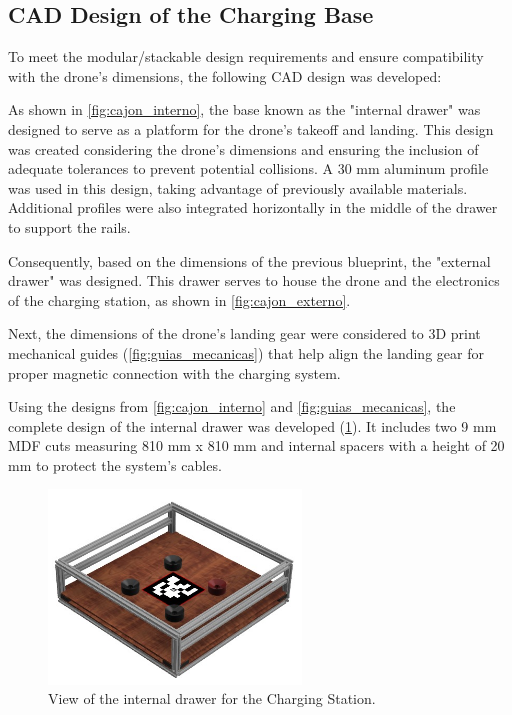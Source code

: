 \subsection{CAD Design of the Charging Base}

To meet the modular/stackable design requirements and ensure compatibility with the drone's dimensions, the following CAD design was developed:

As shown in \ref{fig:cajon_interno}, the base known as the "internal drawer" was designed to serve as a platform for the drone's takeoff and landing. This design was created considering the drone's dimensions and ensuring the inclusion of adequate tolerances to prevent potential collisions. A 30 mm aluminum profile was used in this design, taking advantage of previously available materials. Additional profiles were also integrated horizontally in the middle of the drawer to support the rails.
        
        
Consequently, based on the dimensions of the previous blueprint, the "external drawer" was designed. This drawer serves to house the drone and the electronics of the charging station, as shown in \ref{fig:cajon_externo}.
    

Next, the dimensions of the drone's landing gear were considered to 3D print mechanical guides (\ref{fig:guias_mecanicas}) that help align the landing gear for proper magnetic connection with the charging system.
    

Using the designs from \ref{fig:cajon_interno} and \ref{fig:guias_mecanicas}, the complete design of the internal drawer was developed (\ref{fig:final_interno}). It includes two 9 mm MDF cuts measuring 810 mm x 810 mm and internal spacers with a height of 20 mm to protect the system's cables. 

        \begin{figure}[H]
            \centering
            \includegraphics[width=0.6\textwidth]{pictures/CAJON_INTERNO_FINAL.jpeg}
            \caption{View of the internal drawer for the Charging Station.}
            \label{fig:final_interno}
        \end{figure}

